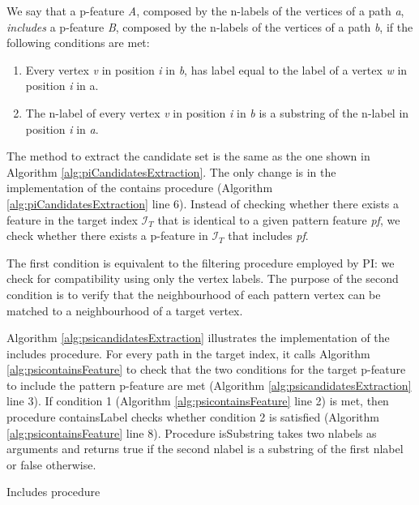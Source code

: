 \documentclass{l4proj}
\newcommand{\fancyI}{\mathcal{I}}
\begin{document}
We say that a p-feature \emph{A}, composed by the n-labels of the vertices of a path \emph{a}, \emph{includes} a p-feature \emph{B}, composed by the n-labels of the vertices of a path \emph{b}, if the following conditions are met:
\begin{enumerate}
\item Every vertex \emph{v} in position \emph{i} in \emph{b}, has label equal to the label of a vertex \emph{w} in position \emph{i} in a.
\item The n-label of every vertex \emph{v} in position \emph{i} in \emph{b} is a substring of the n-label in position \emph{i} in \emph{a}.
\end{enumerate}

The method to extract the candidate set is the same as the one shown in Algorithm \ref{alg:piCandidatesExtraction}. The only change is in the implementation of the contains procedure (Algorithm \ref{alg:piCandidatesExtraction} line 6). Instead of checking whether there exists a feature in the target index $\fancyI_{T}$ that is identical to a given pattern feature \emph{pf}, we check whether there exists a p-feature in $\fancyI_{T}$ that includes \emph{pf}.

The first condition is equivalent to the filtering procedure employed by PI: we check for compatibility using only the vertex labels. The purpose of the second condition is to verify that the neighbourhood of each pattern vertex can be matched to a neighbourhood of a target vertex.

Algorithm \ref{alg:psicandidatesExtraction} illustrates the implementation of the includes procedure. For every path in the target index, it calls Algorithm \ref{alg:psicontainsFeature} to check that the two conditions for the target p-feature to include the pattern p-feature are met (Algorithm \ref{alg:psicandidatesExtraction} line 3). If condition 1 (Algorithm \ref{alg:psicontainsFeature} line 2) is met, then procedure containsLabel checks whether condition 2 is satisfied (Algorithm \ref{alg:psicontainsFeature} line 8). Procedure isSubstring takes two nlabels as arguments and returns true if the second nlabel is a substring of the first nlabel or false otherwise.
\begin{algorithm}
\centering
\caption{Includes procedure}
\label{alg:psicandidatesExtraction}
\begin{algorithmic}[1]
 
    \EndIf
\EndFor
{}
\EndProcedure
\end{algorithmic}
\end{algorithm}
\end{document}
